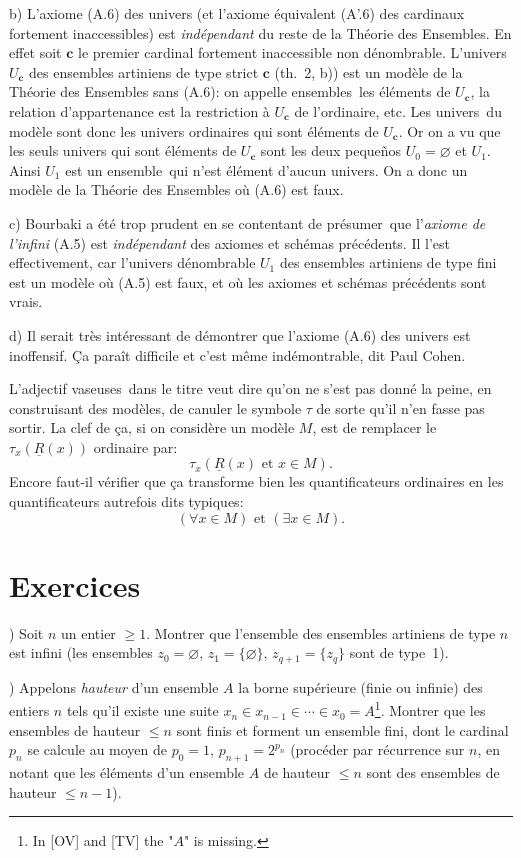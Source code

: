 \documentclass[12pt]{article}
\newcommand{\nn}{\noindent}
\begin{document}
\nn b) L'axiome (A.6) des univers (et l'axiome équivalent (A'.6) des cardinaux fortement inaccessibles) est \emph{indépendant} du reste de la Théorie des Ensembles. En effet soit $\mathbf c$ le premier cardinal fortement inaccessible non dénombrable. L'univers $U_{\mathbf c}$ des ensembles artiniens de type strict $\mathbf c$ (th.~2, b)) est un modèle de la Théorie des Ensembles sans (A.6): on appelle \og ensembles\fg\ les éléments de $U_{\mathbf c}$, la relation d'appartenance est la restriction à $U_{\mathbf c}$ de l'ordinaire, etc. Les \og univers\fg\ du modèle sont donc les univers ordinaires qui sont éléments de $U_{\mathbf c}$. Or on a vu que les seuls univers qui sont éléments de $U_{\mathbf c}$ sont les deux pequeños $U_0 = \varnothing$ et $U_1$. Ainsi $U_1$ est un \og ensemble\fg\ qui n'est élément d'aucun \og univers\fg. On a donc un modèle de la Théorie des Ensembles où (A.6) est faux.

\nn c) Bourbaki a été trop prudent en se contentant de \og présumer\fg\ que l'\emph{axiome de l'infini} (A.5) est \emph{indépendant} des axiomes et schémas précédents. Il l'est effectivement, car l'univers dénombrable $U_1$ des ensembles artiniens de type fini est un modèle où (A.5) est faux, et où les axiomes et schémas précédents sont vrais.

\nn d) Il serait très intéressant de démontrer que l'axiome (A.6) des univers est inoffensif. Ça paraît difficile et c'est même indémontrable, dit Paul Cohen.

L'adjectif \og vaseuses\fg\ dans le titre veut dire qu'on ne s'est pas donné la peine, en construisant des modèles, de canuler le symbole $\tau$ de sorte qu'il n'en fasse pas sortir. La clef de ça, si on considère un modèle $M$, est de remplacer le $\tau_x\left(\underline{R}(x)\right)$ ordinaire par:
$$
\tau_x\left(\underline{R}(x)\text{ et } x\in M\right).
$$
Encore faut-il vérifier que ça transforme bien les quantificateurs ordinaires en les quantificateurs autrefois dits \og typiques\fg:
$$
(\forall x \in M)\text{ et }(\exists x \in M).
$$

\section{Exercices}

\nn1) Soit $n$ un entier $\geq 1$. Montrer que l'ensemble des ensembles artiniens de type $n$ est infini (les ensembles $z_0 = \varnothing$, $z_1=\{\varnothing\}$, $z_{q+1} = \{z_q\}$ sont de type~1).

\nn2) Appelons \emph{hauteur} d'un ensemble $A$ la borne supérieure (finie ou infinie) des entiers $n$ tels qu'il existe une suite $x_n\in x_{n-1}\in \cdots \in x_0 = A$\footnote{In [OV] and [TV] the "$A$" is missing.}. Montrer que les ensembles de hauteur $\leq n$ sont finis et forment un ensemble fini, dont le cardinal $p_n$ se calcule au moyen de $p_0=1$, $p_{n+1}=2^{p_n}$ (procéder par récurrence sur $n$, en notant que les éléments d'un ensemble $A$ de hauteur $\leq n$ sont des ensembles de hauteur $\leq n-1$).
\end{document}
